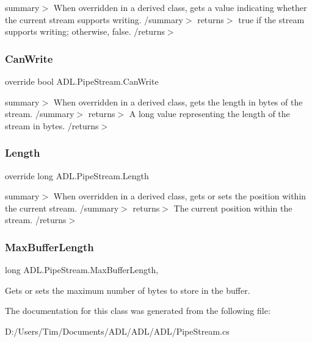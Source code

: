 summary$>$ When overridden in a derived class, gets a value indicating whether the current stream supports writing. /summary$>$ returns$>$ true if the stream supports writing; otherwise, false. /returns$>$ \mbox{\label{class_a_d_l_1_1_pipe_stream_a24b173b85db2cb2c76c8688086e6aebb}} 
\subsubsection{\texorpdfstring{Can\+Write}{CanWrite}}
{\footnotesize\ttfamily override bool A\+D\+L.\+Pipe\+Stream.\+Can\+Write\hspace{0.3cm}{\ttfamily [get]}}

summary$>$ When overridden in a derived class, gets the length in bytes of the stream. /summary$>$ returns$>$ A long value representing the length of the stream in bytes. /returns$>$ \mbox{\label{class_a_d_l_1_1_pipe_stream_a4c9f83e98008f203c5535ad730ca0614}} 
\subsubsection{\texorpdfstring{Length}{Length}}
{\footnotesize\ttfamily override long A\+D\+L.\+Pipe\+Stream.\+Length\hspace{0.3cm}{\ttfamily [get]}}

summary$>$ When overridden in a derived class, gets or sets the position within the current stream. /summary$>$ returns$>$ The current position within the stream. /returns$>$ \mbox{\label{class_a_d_l_1_1_pipe_stream_a250f42c7da667f60487068e27c3d67d0}} 
\subsubsection{\texorpdfstring{Max\+Buffer\+Length}{MaxBufferLength}}
{\footnotesize\ttfamily long A\+D\+L.\+Pipe\+Stream.\+Max\+Buffer\+Length\hspace{0.3cm}{\ttfamily [get]}, {\ttfamily [set]}}



Gets or sets the maximum number of bytes to store in the buffer. 



The documentation for this class was generated from the following file\+:\begin{DoxyCompactItemize}
\item 
D\+:/\+Users/\+Tim/\+Documents/\+A\+D\+L/\+A\+D\+L/\+A\+D\+L/Pipe\+Stream.\+cs\end{DoxyCompactItemize}
